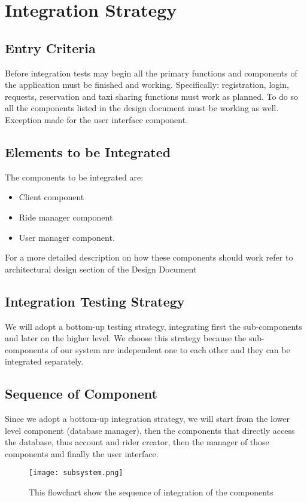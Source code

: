 \section{Integration Strategy}

\subsection{Entry Criteria}
Before integration tests may begin all the primary functions and components of the application must be finished and working.
Specifically: registration, login, requests, reservation and taxi sharing functions must work as planned. To do so all the components listed in the design document must be working as well. Exception made for the user interface component.

\subsection{Elements to be Integrated}
The components to be integrated are:
\begin{itemize}
	\item Client component
	\item Ride manager component
	\item User manager component. 
\end{itemize}
For a more detailed description on how these components should work refer to architectural design section of the Design Document

\subsection{Integration Testing Strategy}
We will adopt a bottom-up testing strategy, integrating first the sub-components and later on the higher level. 
We choose this strategy because the sub-components of our system are independent one to each other and they can be integrated separately.

\subsection{Sequence of Component}
Since we adopt a bottom-up integration strategy, we will start from the lower level component (database manager), then the components that directly access the database, thus account and rider creator, then the manager of those components and finally the user interface.

\begin{figure}[h]
	\centering	
	\texttt{[image: subsystem.png]}
		\caption{This flowchart show the sequence of integration of the components}
\end{figure}
